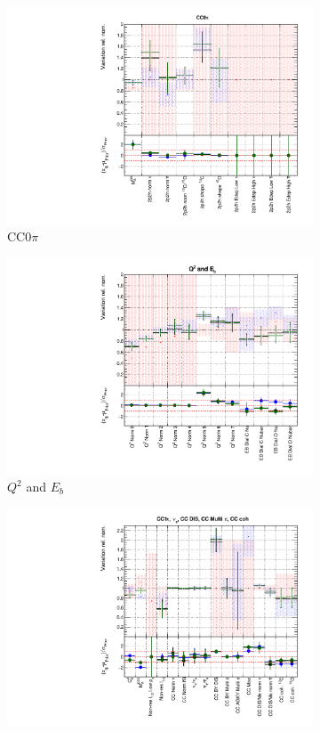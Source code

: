 \begin{figure}
\begin{subfigure}{0.3\textwidth}
\end{subfigure}
\begin{subfigure}{0.49\textwidth}
  \centering
  \includegraphics[width=0.9\linewidth]{figs/polydataxsec_1}
  \caption{CC0$\pi$}
\end{subfigure}
\begin{subfigure}{0.49\textwidth}
  \centering
  \includegraphics[width=0.9\linewidth]{figs/polydataxsec_2}
  \caption{$Q^2$ and $E_b$}
\end{subfigure}
\begin{subfigure}{0.49\textwidth}
  \centering
  \includegraphics[width=0.9\linewidth]{figs/polydataxsec_3}

\end{subfigure}
\end{figure}

